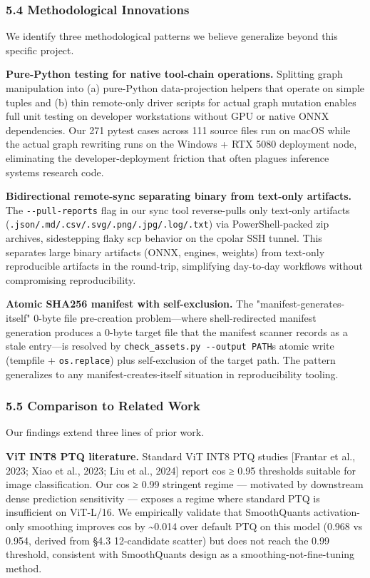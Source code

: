 \documentclass[
]{article}
\begin{document}
\subsubsection{5.4 Methodological
Innovations}\label{54-methodological-innovations}

We identify three methodological patterns we believe generalize beyond
this specific project.

\textbf{Pure-Python testing for native tool-chain operations.} Splitting
graph manipulation into (a) pure-Python data-projection helpers that
operate on simple tuples and (b) thin remote-only driver scripts for
actual graph mutation enables full unit testing on developer
workstations without GPU or native ONNX dependencies. Our 271 pytest
cases across 111 source files run on macOS while the actual graph
rewriting runs on the Windows + RTX 5080 deployment node, eliminating
the developer-deployment friction that often plagues inference systems
research code.

\textbf{Bidirectional remote-sync separating binary from text-only
artifacts.} The \texttt{-\/-pull-reports} flag in our sync tool
reverse-pulls only text-only artifacts
(\texttt{.json/.md/.csv/.svg/.png/.jpg/.log/.txt}) via PowerShell-packed
zip archives, sidestepping flaky scp behavior on the cpolar SSH tunnel.
This separates large binary artifacts (ONNX, engines, weights) from
text-only reproducible artifacts in the round-trip, simplifying
day-to-day workflows without compromising reproducibility.

\textbf{Atomic SHA256 manifest with self-exclusion.} The
"manifest-generates-itself" 0-byte file pre-creation problem---where
shell-redirected manifest generation produces a 0-byte target file that
the manifest scanner records as a stale entry---is resolved by
\texttt{check\_assets.py\ -\/-output\ PATH}\textquotesingle s atomic
write (tempfile + \texttt{os.replace}) plus self-exclusion of the target
path. The pattern generalizes to any manifest-creates-itself situation
in reproducibility tooling.

\subsubsection{5.5 Comparison to Related
Work}\label{55-comparison-to-related-work}

Our findings extend three lines of prior work.

\textbf{ViT INT8 PTQ literature.} Standard ViT INT8 PTQ studies
{[}Frantar et al., 2023; Xiao et al., 2023; Liu et al., 2024{]} report
cos ≥ 0.95 thresholds suitable for image classification. Our cos ≥ 0.99
stringent regime --- motivated by downstream dense prediction
sensitivity --- exposes a regime where standard PTQ is insufficient on
ViT-L/16. We empirically validate that SmoothQuant\textquotesingle s
activation-only smoothing improves cos by \textasciitilde0.014 over
default PTQ on this model (0.968 vs 0.954, derived from §4.3
12-candidate scatter) but does not reach the 0.99 threshold, consistent
with SmoothQuant\textquotesingle s design as a smoothing-not-fine-tuning
method.
\end{document}
